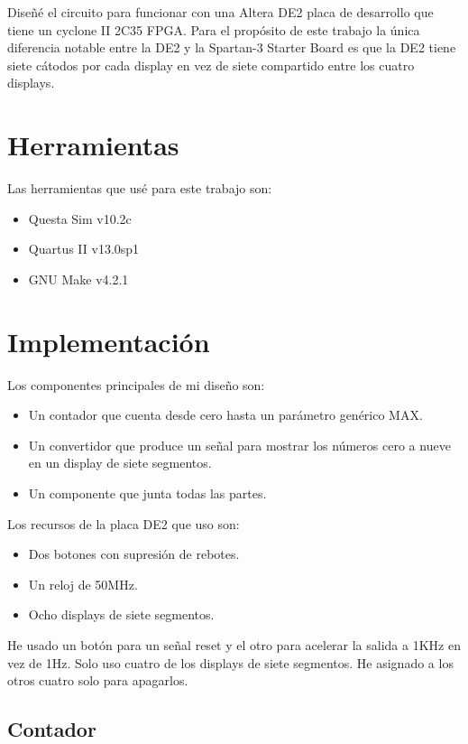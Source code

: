 \documentclass[a4paper]{article}
\begin{document}
Diseñé el circuito para funcionar con una Altera DE2 placa de desarrollo que tiene un cyclone II 2C35 FPGA. Para el propósito de este trabajo la única diferencia notable entre la DE2 y la Spartan-3 Starter Board es que la DE2 tiene siete cátodos por cada display en vez de siete compartido entre los cuatro displays.

\section{Herramientas}

Las herramientas que usé para este trabajo son:
\begin{itemize}
\item Questa Sim v10.2c
\item Quartus II v13.0sp1
\item GNU Make v4.2.1
\end{itemize}

\section{Implementación}

Los componentes principales de mi diseño son:

\begin{itemize}
\item Un contador que cuenta desde cero hasta un parámetro genérico MAX.
\item Un convertidor que produce un señal para mostrar los números cero a nueve en un display de siete segmentos.
\item Un componente que junta todas las partes. \\
\end{itemize}

Los recursos de la placa DE2 que uso son:
\begin{itemize}
\item Dos botones con supresión de rebotes.
\item Un reloj de 50MHz.
\item Ocho displays de siete segmentos. \\
\end{itemize}

He usado un botón para un señal reset y el otro para acelerar la salida a 1KHz en vez de 1Hz. Solo uso cuatro de los displays de siete segmentos. He asignado a los otros cuatro solo para apagarlos.

\subsection{Contador}
\end{document}
